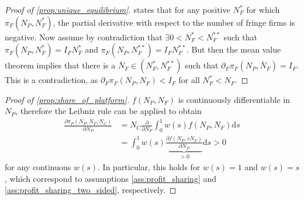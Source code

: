 \documentclass[a4paper]{article}
\newcommand{\ds}{\mathrm{d}s}
\begin{document}
\begin{proof}[Proof of \cref{prop:unique_equilibrium}]
     states that for any positive $N_F^*$ for which $\pi_F(N_P, N_F^*)$, the partial derivative with respect to the number of fringe firms is negative.
    Now assume by contradiction that $\exists 0 < N_F^* < N_F^{**}$ such that $\pi_F(N_P, N_F^*) = I_F N_F^*$ and $\pi_F(N_P, N_F^{**}) = I_F N_F^{**}$.
    But then the mean value theorem implies that there is a $\bar{N}_F \in (N_F^*, N_F^{**})$ such that $\partial_F \pi_F(N_P, \bar{N}_F) = I_F$.
    This is a contradiction, as $\partial_F \pi_F(N_P, N_F) < I_F$ for all $N_F^* < N_F$.
\end{proof}

\begin{proof}[Proof of \cref{prop:share_of_platform}]
    $f(N_P, N_F)$ is continuously differentiable in $N_P$, therefore the Leibniz rule can be applied to obtain
    \begin{align*}
        \frac{\partial \pi_P(N_P, N_F, N_C)}{\partial N_P} &= N_C \frac{\partial}{\partial N_P} \int_0^1 w(s) f(N_P, N_F) \ds \\
        &= \int_0^1 w(s) \underbrace{\frac{\partial f(N_P, sN_F)}{\partial N_P}}_{> 0} \ds > 0
    \end{align*}
    for any continuous $w(s)$.
    In particular, this holds for $w(s) = 1$ and $w(s) = s$, which correspond to assumptions \cref{ass:profit_sharing} and \cref{ass:profit_sharing_two_sided}, respectively.
\end{proof}
\end{document}
